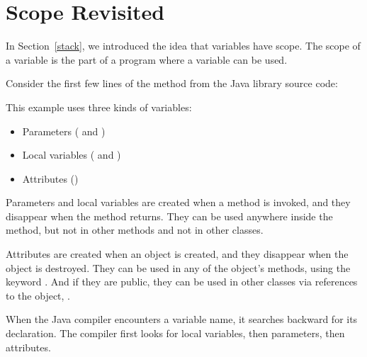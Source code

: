 \section{Scope Revisited}
\label{mutable-objects_scope-revisited}


In Section~\ref{stack}, we introduced the idea that variables have scope.
The scope of a variable is the part of a program where a variable can be used.

Consider the first few lines of the  method from the Java library source code:


\begin{code}
public void translate(int dx, int dy) {
    int oldv = this.x;
    int newv = oldv + dx;
    if (dx < 0) {
    ...
\end{code}

This example uses three kinds of variables:

\begin{itemize}

\item Parameters ( and )

\item Local variables ( and )


\item Attributes ()

\end{itemize}

Parameters and local variables are created when a method is invoked, and they disappear when the method returns.
They can be used anywhere inside the method, but not in other methods and not in other classes.

Attributes are created when an object is created, and they disappear when the object is destroyed.
They can be used in any of the object's methods, using the keyword .
And if they are public, they can be used in other classes via references to the object, .

When the Java compiler encounters a variable name, it searches backward for its declaration.
The compiler first looks for local variables, then parameters, then attributes.



